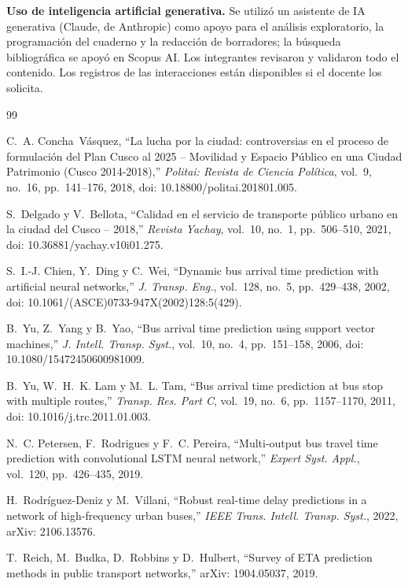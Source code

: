 \documentclass[conference,a4paper]{IEEEtran}
\begin{document}
\textbf{Uso de inteligencia artificial generativa.} Se utilizó un asistente de IA generativa (Claude, de Anthropic) como apoyo para el análisis exploratorio, la programación del cuaderno y la redacción de borradores; la búsqueda bibliográfica se apoyó en Scopus AI. Los integrantes revisaron y validaron todo el contenido. Los registros de las interacciones están disponibles si el docente los solicita.

\begin{thebibliography}{99}
\footnotesize

C.~A. Concha~Vásquez, ``La lucha por la ciudad: controversias en el proceso de formulación del Plan Cusco al 2025 -- Movilidad y Espacio Público en una Ciudad Patrimonio (Cusco 2014-2018),'' \emph{Politai: Revista de Ciencia Política}, vol.~9, no.~16, pp.~141--176, 2018, doi: 10.18800/politai.201801.005.

S.~Delgado y V.~Bellota, ``Calidad en el servicio de transporte público urbano en la ciudad del Cusco -- 2018,'' \emph{Revista Yachay}, vol.~10, no.~1, pp.~506--510, 2021, doi: 10.36881/yachay.v10i01.275.

S.~I.-J. Chien, Y.~Ding y C.~Wei, ``Dynamic bus arrival time prediction with artificial neural networks,'' \emph{J. Transp. Eng.}, vol.~128, no.~5, pp.~429--438, 2002, doi: 10.1061/(ASCE)0733-947X(2002)128:5(429).

B.~Yu, Z.~Yang y B.~Yao, ``Bus arrival time prediction using support vector machines,'' \emph{J. Intell. Transp. Syst.}, vol.~10, no.~4, pp.~151--158, 2006, doi: 10.1080/15472450600981009.

B.~Yu, W.~H.~K. Lam y M.~L. Tam, ``Bus arrival time prediction at bus stop with multiple routes,'' \emph{Transp. Res. Part C}, vol.~19, no.~6, pp.~1157--1170, 2011, doi: 10.1016/j.trc.2011.01.003.

N.~C. Petersen, F.~Rodrigues y F.~C. Pereira, ``Multi-output bus travel time prediction with convolutional LSTM neural network,'' \emph{Expert Syst. Appl.}, vol.~120, pp.~426--435, 2019.

H.~Rodríguez-Deniz y M.~Villani, ``Robust real-time delay predictions in a network of high-frequency urban buses,'' \emph{IEEE Trans. Intell. Transp. Syst.}, 2022, arXiv: 2106.13576.

T.~Reich, M.~Budka, D.~Robbins y D.~Hulbert, ``Survey of ETA prediction methods in public transport networks,'' arXiv: 1904.05037, 2019.


\end{thebibliography}
\end{document}
